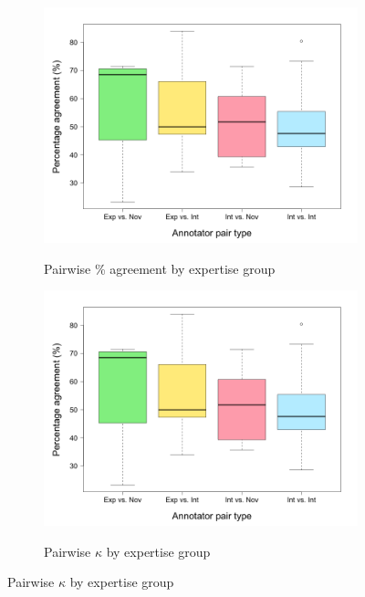 		\begin{figure}[p]
			\centering
			
			
			\begin{subfigure}{\textwidth}
				\centering
				\caption{Pairwise \% agreement by expertise group}
				\includegraphics[width=.9\textwidth]{img/plots/pairwisePctByExpertise-noTitle}
				\label{fig:agreement:expertise:pct}
			\end{subfigure}%
			
			\vspace{1em}			
			
			\begin{subfigure}{\textwidth}
				\centering
				\caption{Pairwise $\kappa$ by expertise group}
				\includegraphics[width=.9\textwidth]{img/plots/pairwisePctByExpertise-noTitle}
				\label{fig:agreement:expertise:k}
			\end{subfigure}%
			

\end{figure}
